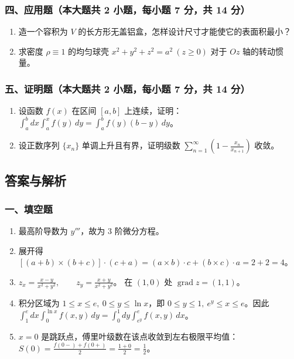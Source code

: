 \subsubsection*{四、应用题（本大题共 2 小题，每小题 7 分，共 14 分）}
\begin{enumerate}
  \item 造一个容积为 $V$ 的长方形无盖铝盒，怎样设计尺寸才能使它的表面积最小？
  \item 求密度 $\rho\equiv1$ 的均匀球壳 $x^2+y^2+z^2=a^2\ (z\ge0)$ 对于 $Oz$ 轴的转动惯量。
\end{enumerate}

\subsubsection*{五、证明题（本大题共 2 小题，每小题 7 分，共 14 分）}
\begin{enumerate}
  \item 设函数 $f(x)$ 在区间 $[a,b]$ 上连续，证明：
  \(\displaystyle \int_a^b dx\int_a^x f(y)\,dy=\int_a^b f(y)(b-y)\,dy\)。
  \item 设正数序列 $\{x_n\}$ 单调上升且有界，证明级数 \(\displaystyle \sum_{n=1}^{\infty}\left(1-\frac{x_n}{x_{n+1}}\right)\)
  收敛。
\end{enumerate}

\subsection{答案与解析}

\subsubsection*{一、填空题}
\begin{enumerate}
  \item 最高阶导数为 $y'''$，故为 $3$ 阶微分方程。
  \item 展开得 \(\displaystyle [(a+b)\times(b+c)]\cdot(c+a)
  =(a\times b)\cdot c+(b\times c)\cdot a=2+2=4\)。
  \item \(\displaystyle z_x=\frac{x-y}{x^2+y^2},\qquad z_y=\frac{x+y}{x^2+y^2}\)。
  在 $(1,0)$ 处 $\operatorname{grad}z=(1,1)$。
  \item 积分区域为 $1\le x\le e,\ 0\le y\le\ln x$，即 $0\le y\le1,\ e^y\le x\le e$。因此
  \(\displaystyle \int_1^e dx\int_0^{\ln x}f(x,y)\,dy
  =\int_0^1dy\int_{e^y}^e f(x,y)\,dx\)。
  \item $x=0$ 是跳跃点，傅里叶级数在该点收敛到左右极限平均值：
  \(\displaystyle S(0)=\frac{f(0-)+f(0+)}2=\frac{1+0}{2}=\frac12\)。
\end{enumerate}

